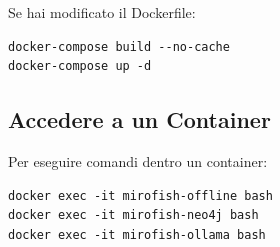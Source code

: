 Se hai modificato il Dockerfile:

\begin{lstlisting}
docker-compose build --no-cache
docker-compose up -d
\end{lstlisting}

\subsection{Accedere a un Container}

Per eseguire comandi dentro un container:

\begin{lstlisting}
docker exec -it mirofish-offline bash
docker exec -it mirofish-neo4j bash
docker exec -it mirofish-ollama bash
\end{lstlisting}
